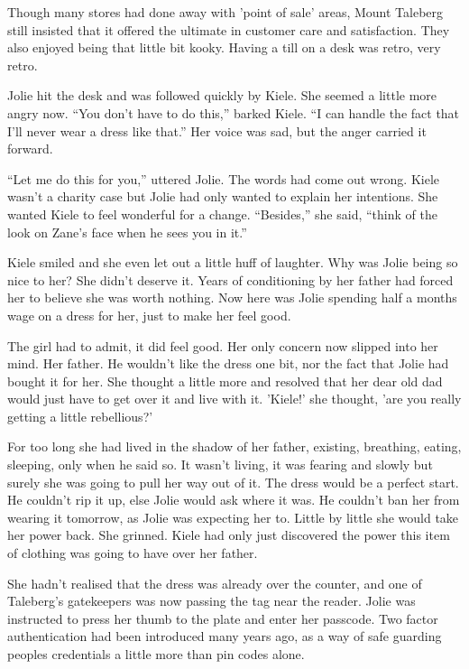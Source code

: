 Though many stores had done away with 'point of sale' areas, Mount Taleberg still insisted that it offered the ultimate in customer care and satisfaction.  They also enjoyed being that little bit kooky.  Having a till on a desk was retro, very retro.

Jolie hit the desk and was followed quickly by Kiele.  She seemed a little more angry now.  ``You don't have to do this,'' barked Kiele.  ``I can handle the fact that I'll never wear a dress like that.''  Her voice was sad, but the anger carried it forward.

``Let me do this for you,'' uttered Jolie.  The words had come out wrong.  Kiele wasn't a charity case but Jolie had only wanted to explain her intentions.  She wanted Kiele to feel wonderful for a change.  ``Besides,'' she said, ``think of the look on Zane's face when he sees you in it.''

Kiele smiled and she even let out a little huff of laughter.  Why was Jolie being so nice to her?  She didn't deserve it.  Years of conditioning by her father had forced her to believe she was worth nothing.  Now here was Jolie spending half a months wage on a dress for her, just to make her feel good.  

The girl had to admit, it did feel good.  Her only concern now slipped into her mind.  Her father.  He wouldn't like the dress one bit, nor the fact that Jolie had bought it for her.  She thought a little more and resolved that her dear old dad would just have to get over it and live with it.  'Kiele!' she thought, 'are you really getting a little rebellious?'

For too long she had lived in the shadow of her father, existing, breathing, eating, sleeping, only when he said so.  It wasn't living, it was fearing and slowly but surely she was going to pull her way out of it.  The dress would be a perfect start.  He couldn't rip it up, else Jolie would ask where it was.  He couldn't ban her from wearing it tomorrow, as Jolie was expecting her to.  Little by little she would take her power back.  She grinned.  Kiele had only just discovered the power this item of clothing was going to have over her father.

She hadn't realised that the dress was already over the counter, and one of Taleberg's gatekeepers was now passing the tag near the reader.  Jolie was instructed to press her thumb to the plate and enter her passcode.  Two factor authentication had been introduced many years ago, as a way of safe guarding peoples credentials a little more than pin codes alone.

